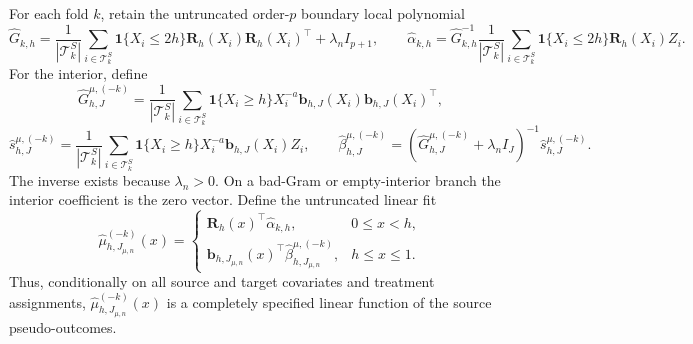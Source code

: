 For each fold \(k\), retain the untruncated order-\(p\) boundary local polynomial
\[
\widehat G_{k,h}=\frac1{|\mathcal T^S_k|}\sum_{i\in\mathcal T^S_k}\mathbf 1\{X_i\le2h\}\mathbf R_h(X_i)\mathbf R_h(X_i)^\top+\lambda_nI_{p+1},
\qquad
\widehat\alpha_{k,h}=\widehat G_{k,h}^{-1}\frac1{|\mathcal T^S_k|}\sum_{i\in\mathcal T^S_k}\mathbf 1\{X_i\le2h\}\mathbf R_h(X_i)Z_i.
\]
For the interior, define
\[
\widehat G^{\mu,(-k)}_{h,J}
=\frac1{|\mathcal T^S_k|}\sum_{i\in\mathcal T^S_k}\mathbf 1\{X_i\ge h\}X_i^{-a}\mathbf b_{h,J}(X_i)\mathbf b_{h,J}(X_i)^\top,
\]
\[
\widehat s^{\mu,(-k)}_{h,J}
=\frac1{|\mathcal T^S_k|}\sum_{i\in\mathcal T^S_k}\mathbf 1\{X_i\ge h\}X_i^{-a}\mathbf b_{h,J}(X_i)Z_i,
\qquad
\widehat\beta^{\mu,(-k)}_{h,J}
=\left(\widehat G^{\mu,(-k)}_{h,J}+\lambda_nI_J\right)^{-1}\widehat s^{\mu,(-k)}_{h,J}.
\]
The inverse exists because \(\lambda_n>0\).  On a bad-Gram or empty-interior branch the interior coefficient is the zero vector.  Define the untruncated linear fit
\[
\widehat\mu^{(-k)}_{h,J_{\mu,n}}(x)=
\begin{cases}
\mathbf R_h(x)^\top\widehat\alpha_{k,h},&0\le x<h,\\
\mathbf b_{h,J_{\mu,n}}(x)^\top\widehat\beta^{\mu,(-k)}_{h,J_{\mu,n}},&h\le x\le1.
\end{cases}
\]
Thus, conditionally on all source and target covariates and treatment assignments, \(\widehat\mu^{(-k)}_{h,J_{\mu,n}}(x)\) is a completely specified linear function of the source pseudo-outcomes.